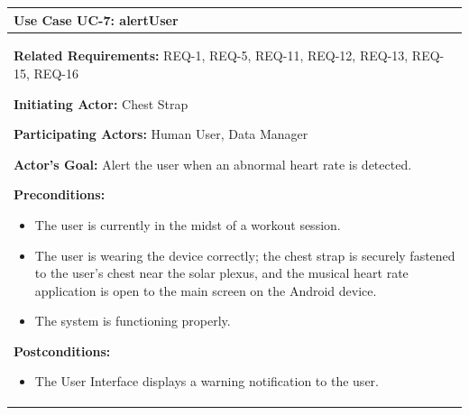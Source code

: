 \documentclass[letterpaper,english, 12pt]{scrreprt}
\begin{document}
\begin{center}
        \begin{longtable}{|C{15cm}|}
                \hline
                        \textbf{Use Case UC-7: alertUser}\\
                
			\hline
	\nopagebreak
                        \begin{flushleft}
                                \textbf{Related Requirements: } REQ-1, REQ-5, REQ-11, REQ-12, REQ-13, REQ-15, REQ-16
                        \end{flushleft}
                        \begin{flushleft}
                                \textbf{Initiating Actor: } Chest Strap
                        \end{flushleft}
                        \begin{flushleft}
                                \textbf{Participating Actors: } Human User, Data Manager
                        \end{flushleft}
                        \begin{flushleft}
                                \textbf{Actor's Goal: } Alert the user when an abnormal heart rate is detected.
                        \end{flushleft}
                        \begin{flushleft}
                                \textbf{Preconditions: }
                        \end{flushleft}
                                \begin{itemize}
                                        \item The user is currently in the midst of a workout session.
                                        \item The user is wearing the device correctly; the chest strap is securely fastened to the user's chest near the solar plexus, and the musical heart rate application is open to the main screen on the Android device.
										\item The system is functioning properly.
								\end{itemize}
                        \begin{flushleft}
                                \textbf{Postconditions: }
                        \end{flushleft}
                                \begin{itemize}
                                        \item The User Interface displays a warning notification to the user.

\end{itemize}
\end{longtable}
\end{center}
\end{document}

